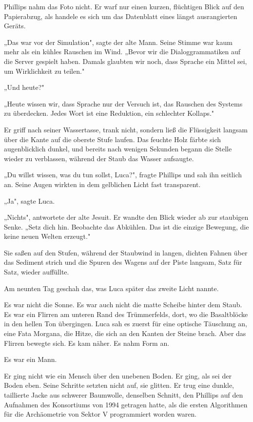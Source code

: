 \documentclass[
  ngerman,
]{article}
\begin{document}
Phillips nahm das Foto nicht. Er warf nur einen kurzen, flüchtigen Blick
auf den Papierabzug, als handele es sich um das Datenblatt eines längst
ausrangierten Geräts.

„Das war vor der Simulation", sagte der alte Mann. Seine Stimme war kaum
mehr als ein kühles Rauschen im Wind. „Bevor wir die Dialoggrammatiken
auf die Server gespielt haben. Damals glaubten wir noch, dass Sprache
ein Mittel sei, um Wirklichkeit zu teilen."

„Und heute?"

„Heute wissen wir, dass Sprache nur der Versuch ist, das Rauschen des
Systems zu überdecken. Jedes Wort ist eine Reduktion, ein schlechter
Kollaps."

Er griff nach seiner Wassertasse, trank nicht, sondern ließ die
Flüssigkeit langsam über die Kante auf die oberste Stufe laufen. Das
feuchte Holz färbte sich augenblicklich dunkel, und bereits nach wenigen
Sekunden begann die Stelle wieder zu verblassen, während der Staub das
Wasser aufsaugte.

„Du willst wissen, was du tun sollst, Luca?", fragte Phillips und sah
ihn seitlich an. Seine Augen wirkten in dem gelblichen Licht fast
transparent.

„Ja", sagte Luca.

„Nichts", antwortete der alte Jesuit. Er wandte den Blick wieder ab zur
staubigen Senke. „Setz dich hin. Beobachte das Abkühlen. Das ist die
einzige Bewegung, die keine neuen Welten erzeugt."

Sie saßen auf den Stufen, während der Staubwind in langen, dichten
Fahnen über das Sediment strich und die Spuren des Wagens auf der Piste
langsam, Satz für Satz, wieder auffüllte.

Am neunten Tag geschah das, was Luca später das zweite Licht nannte.

Es war nicht die Sonne. Es war auch nicht die matte Scheibe hinter dem
Staub. Es war ein Flirren am unteren Rand des Trümmerfelds, dort, wo die
Basaltblöcke in den hellen Ton übergingen. Luca sah es zuerst für eine
optische Täuschung an, eine Fata Morgana, die Hitze, die sich an den
Kanten der Steine brach. Aber das Flirren bewegte sich. Es kam näher. Es
nahm Form an.

Es war ein Mann.

Er ging nicht wie ein Mensch über den unebenen Boden. Er ging, als sei
der Boden eben. Seine Schritte setzten nicht auf, sie glitten. Er trug
eine dunkle, taillierte Jacke aus schwerer Baumwolle, denselben Schnitt,
den Phillips auf den Aufnahmen des Konsortiums von 1994 getragen hatte,
als die ersten Algorithmen für die Archäometrie von Sektor V
programmiert worden waren.
\end{document}
